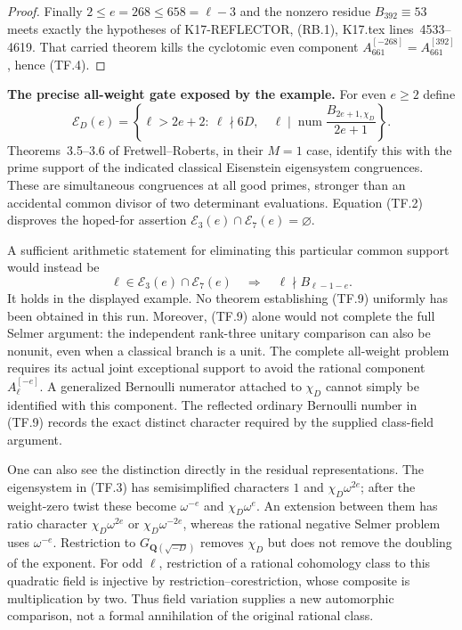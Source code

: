 \documentclass[11pt,a4paper]{article}
\theoremstyle{definition}
\renewcommand{\paragraph}[1]{\par\smallskip\noindent\textbf{#1}\quad\ignorespaces}
\begin{document}
\begin{proof}
Finally $2\leq e=268\leq658=\ell-3$ and the nonzero
residue $B_{392}\equiv53$ meets exactly the hypotheses
of K17-REFLECTOR, (RB.1), K17.tex lines~4533--4619.
That carried theorem kills the cyclotomic even component
$A_{661}^{[-268]}=A_{661}^{[392]}$, hence (TF.4).
\end{proof}

\paragraph{The precise all-weight gate exposed by the example.}
For even $e\geq2$ define
\[
 \mathcal E_D(e)=\left\{\ell>2e+2:\ \ell\nmid6D,\quad
       \ell\mid\operatorname{num}
                 \frac{B_{2e+1,\chi_D}}{2e+1}\right\}.
                                                               \tag{TF.8}
\]
Theorems~3.5--3.6 of Fretwell--Roberts, in their $M=1$
case, identify this with the prime support of the indicated
classical Eisenstein eigensystem congruences. These are
simultaneous congruences at all good primes, stronger than
an accidental common divisor of two determinant evaluations.
Equation (TF.2) disproves the hoped-for assertion
$\mathcal E_3(e)\cap\mathcal E_7(e)=\varnothing$.

A sufficient arithmetic statement for eliminating this
particular common support would instead be
\[
 \ell\in\mathcal E_3(e)\cap\mathcal E_7(e)
          \quad\Longrightarrow\quad
                   \ell\nmid B_{\ell-1-e}.
                                                               \tag{TF.9}
\]
It holds in the displayed example. No theorem establishing
(TF.9) uniformly has been obtained in this run. Moreover,
(TF.9) alone would not complete the full Selmer argument:
the independent rank-three unitary comparison can also be
nonunit, even when a classical branch is a unit. The
complete all-weight problem requires its actual joint
exceptional support to avoid the rational component
$A_\ell^{[-e]}$. A generalized Bernoulli numerator attached
to $\chi_D$ cannot simply be identified with this component.
The reflected ordinary Bernoulli number in (TF.9) records
the exact distinct character required by the supplied
class-field argument.

One can also see the distinction directly in the residual
representations. The eigensystem in (TF.3) has semisimplified
characters $1$ and $\chi_D\omega^{2e}$; after the weight-zero
twist these become $\omega^{-e}$ and $\chi_D\omega^e$.
An extension between them has ratio character
$\chi_D\omega^{2e}$ or $\chi_D\omega^{-2e}$, whereas
the rational negative Selmer problem uses $\omega^{-e}$.
Restriction to $G_{\mathbf Q(\sqrt{-D})}$ removes
$\chi_D$ but does not remove the doubling of the exponent.
For odd $\ell$, restriction of a rational cohomology class
to this quadratic field is injective by restriction--corestriction,
whose composite is multiplication by two. Thus field
variation supplies a new automorphic comparison, not a
formal annihilation of the original rational class.
\end{document}
